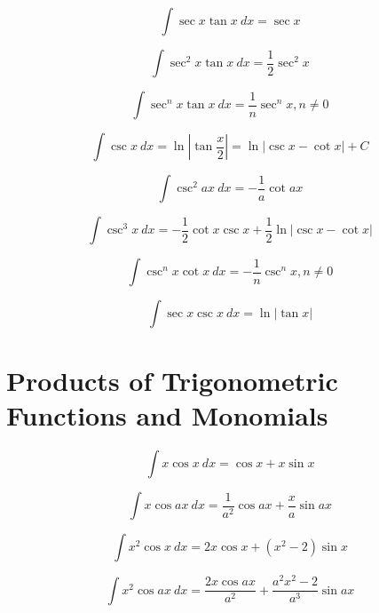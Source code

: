 \begin{equation}
\int \sec x \tan x\ dx = \sec x 
\end{equation}

\begin{equation}
\int \sec^2 x \tan x\ dx = \frac{1}{2} \sec^2 x 
\end{equation}

\begin{equation}
\int \sec^n x \tan x \ dx = \frac{1}{n} \sec^n x , n\ne 0
\end{equation}

\begin{equation}
\int \csc x\ dx = \ln \left | \tan \frac{x}{2} \right|  = \ln | \csc x - \cot x| + C
\end{equation}

\begin{equation}
\int \csc^2 ax\ dx = -\frac{1}{a} \cot ax 
\end{equation}

\begin{equation}
\int \csc^3 x\ dx = -\frac{1}{2}\cot x \csc x + \frac{1}{2} \ln | \csc x - \cot x | 
\end{equation}

\begin{equation}
\int \csc^nx \cot x\ dx = -\frac{1}{n}\csc^n x, n\ne 0
\end{equation}

\begin{equation}
\int \sec x \csc x \ dx = \ln | \tan x | 
\end{equation}


\section*{Products of Trigonometric Functions and Monomials}

\begin{equation}
\int x \cos x \ dx = \cos x + x \sin x 
\end{equation}

\begin{equation}
\int x \cos ax \ dx = \frac{1}{a^2} \cos ax + \frac{x}{a} \sin ax 
\end{equation}

\begin{equation}
\int x^2 \cos x \ dx = 2 x \cos x + \left ( x^2 - 2 \right ) \sin x 
\end{equation}

\begin{equation}
\int x^2 \cos ax \ dx = \frac{2 x \cos ax }{a^2} + \frac{ a^2 x^2 - 2  }{a^3} \sin ax 
\end{equation}

